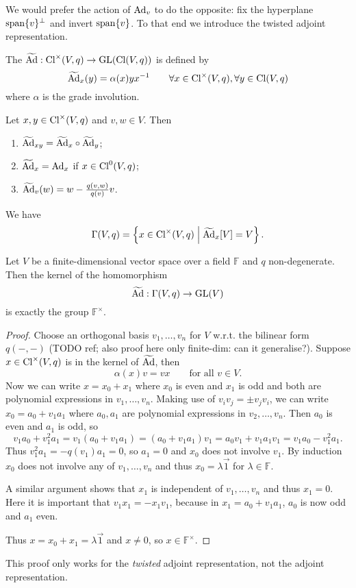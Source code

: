 We would prefer the action of $\operatorname{Ad}_v$ to do the opposite: fix the hyperplane $\operatorname{span}\{v\}^\perp$ and invert $\operatorname{span}\{v\}$. To that end we introduce the twisted adjoint representation.
\begin{definition}
The  $\widetilde{\operatorname{Ad}}: \operatorname{Cl}^\times(V,q) \to \operatorname{GL}(\operatorname{Cl}(V,q))$ is defined by
\[ \widetilde{\operatorname{Ad}}_x(y) = \alpha(x)yx^{-1} \qquad \forall x\in \operatorname{Cl}^\times(V,q), \forall y\in \operatorname{Cl}(V,q) \]
where $\alpha$ is the grade involution.
\end{definition}
\begin{lemma}
Let $x,y\in \operatorname{Cl}^\times(V,q)$ and $v,w\in V$. Then
\begin{enumerate}
\item $\widetilde{\operatorname{Ad}}_{xy} = \widetilde{\operatorname{Ad}}_x\circ \widetilde{\operatorname{Ad}}_y$;
\item $\widetilde{\operatorname{Ad}}_x = \operatorname{Ad}_x$ if $x\in \operatorname{Cl}^0(V,q)$;
\item $\widetilde{\operatorname{Ad}}_v(w) = w-\frac{q(v,w)}{q(v)}v$.
\end{enumerate}
\end{lemma}

We have
\[ \Gamma(V,q) = \left\{ x\in\operatorname{Cl}^\times(V,q) \;\middle|\; \widetilde{\operatorname{Ad}}_x[V] = V \right\}. \]

\begin{proposition}
Let $V$ be a finite-dimensional vector space over a field $\mathbb{F}$ and $q$ non-degenerate. Then the kernel of the homomorphism
\[ \widetilde{\operatorname{Ad}}: \Gamma(V,q) \to \operatorname{GL}(V) \]
is exactly the group $\mathbb{F}^\times$.
\end{proposition}
\begin{proof}
Choose an orthogonal basis $v_1,\ldots, v_n$ for $V$ w.r.t. the bilinear form $q(-,-)$ (TODO ref; also proof here only finite-dim: can it generalise?). Suppose $x\in \operatorname{Cl}^\times(V,q)$ is in the kernel of $\widetilde{\operatorname{Ad}}$, then
\[ \alpha(x)v = vx \qquad \text{for all $v\in V$.} \]
Now we can write $x = x_0 + x_1$ where $x_0$ is even and $x_1$ is odd and both are polynomial expressions in $v_1,\ldots, v_n$. Making use of $v_iv_j = \pm v_jv_i$, we can write $x_0 = a_0 + v_1a_1$ where $a_0,a_1$ are polynomial expressions in $v_2,\ldots, v_n$. Then $a_0$ is even and $a_1$ is odd, so
\[ v_1a_0 + v_1^2a_1 = v_1(a_0+v_1a_1) = (a_0+v_1a_1)v_1 = a_0v_1 + v_1 a_1 v_1 = v_1a_0-v_1^2 a_1. \]
Thus $v^2_1a_1 = -q(v_1)a_1 = 0$, so $a_1=0$ and $x_0$ does not involve $v_1$. By induction $x_0$ does not involve any of $v_1,\ldots, v_n$ and thus $x_0 = \lambda \vec{1}$ for $\lambda\in\mathbb{F}$.

A similar argument shows that $x_1$ is independent of $v_1,\ldots, v_n$ and thus $x_1=0$. Here it is important that $v_1x_1 = -x_1v_1$, because in $x_1 = a_0 + v_1a_1$, $a_0$ is now odd and $a_1$ even.

Thus $x = x_0+x_1 = \lambda \vec{1}$ and $x\neq 0$, so $x\in \mathbb{F}^\times$.
\end{proof}
This proof only works for the \textit{twisted} adjoint representation, not the adjoint representation.

